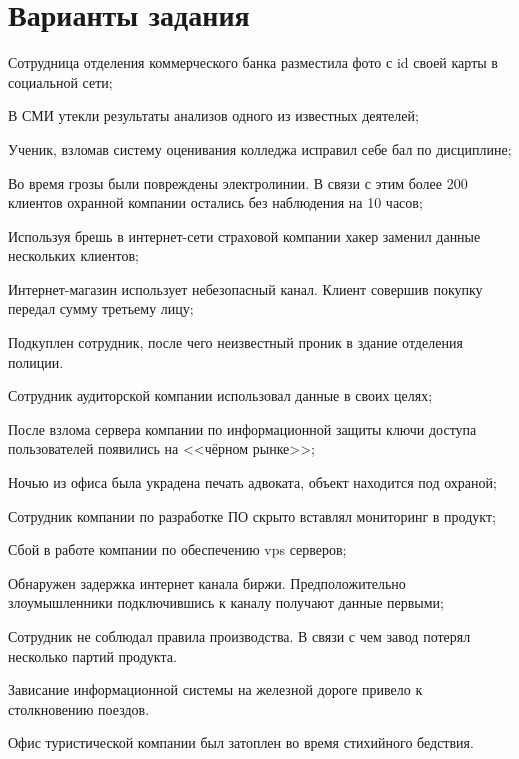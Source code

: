 \section{Варианты задания}\label{sect1_d}

\label{var_PR1}
\begin{Notes}
    \setcounter{notes}{-1}
    \item Сотрудница отделения коммерческого банка разместила фото с id своей карты в социальной сети;
    \item В СМИ утекли результаты анализов одного из известных деятелей;
    \item Ученик, взломав систему оценивания колледжа исправил себе бал по дисциплине;
    \item Во время грозы были повреждены электролинии. В связи с этим более 200 клиентов охранной компании остались без наблюдения на 10 часов;
    \item Используя брешь в интернет-сети страховой компании хакер заменил данные нескольких клиентов;
    \item Интернет-магазин использует небезопасный канал. Клиент совершив покупку передал сумму третьему лицу;
    \item Подкуплен сотрудник, после чего неизвестный проник в здание отделения полиции.
    \item Сотрудник аудиторской компании использовал данные в своих целях;
    \item После взлома сервера компании по информационной защиты ключи доступа пользователей появились на <<чёрном рынке>>;
    \item Ночью из офиса была украдена печать адвоката, объект находится под охраной;
    \item Сотрудник компании по разработке ПО скрыто вставлял мониторинг в продукт;
    \item Сбой в работе компании по обеспечению vps серверов;
    \item Обнаружен задержка интернет канала биржи. Предположительно злоумышленники подключившись к каналу получают данные первыми;
    \item Сотрудник не соблюдал правила производства. В связи с чем завод потерял несколько партий продукта.
    \item Зависание информационной системы на железной дороге привело к столкновению поездов.
    \item Офис туристической компании был затоплен во время стихийного бедствия.
  \end{Notes}

